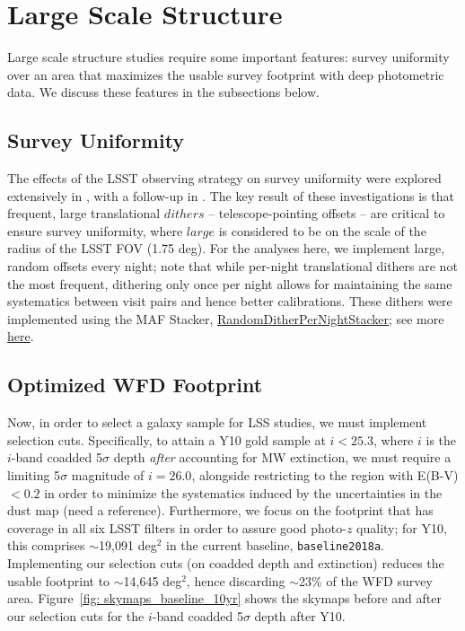 \newcommand{\ttt}[1]{\texttt{#1}}

\section{Large Scale Structure}
Large scale structure studies require some important features: survey uniformity over an area that maximizes the usable survey footprint with deep photometric data.  We discuss these features in the subsections below.
\subsection{Survey Uniformity}
The effects of the LSST observing strategy on survey uniformity were explored extensively in \citet{Awan+2016}, with a follow-up in \citet[Section 9.2]{Marshall:2017wph}. The key result of these investigations is that frequent, large translational $dithers$ -- telescope-pointing offsets -- are critical to ensure survey uniformity, where $large$ is considered to be on the scale of the radius of the LSST FOV (1.75 deg). For the analyses here, we implement large, random offsets every night; note that while per-night translational dithers are not the most frequent, dithering only once per night allows for maintaining the same systematics between visit pairs and hence better calibrations. These dithers were implemented using the MAF Stacker, \href{https://github.com/lsst/sims_maf/blob/97988f6bc30c216fffb41e6da0a7d201e919b9ca/python/lsst/sims/maf/stackers/ditherStackers.py#L371}{RandomDitherPerNightStacker}; see more \href{https://github.com/LSSTDESC/ObsStrat/tree/issue/3/desc-dithers}{here}.

\subsection{Optimized WFD Footprint}
Now, in order to select a galaxy sample for LSS studies, we must implement selection cuts. Specifically, to attain a Y10 gold sample at $i<25.3$, where $i$ is the $i$-band coadded 5$\sigma$ depth {\em after} accounting for MW extinction, we must require a limiting 5$\sigma$ magnitude of $i=26.0$, alongside restricting to the region with E(B-V) $<0.2$ in order to minimize the systematics induced by the uncertainties in the dust map (need a reference). Furthermore, we focus on the footprint that has coverage in all six LSST filters in order to assure good photo-$z$ quality; for Y10, this comprises $\sim$19,091 deg$^2$ in the current baseline, \ttt{baseline2018a}. Implementing our selection cuts (on coadded depth and extinction) reduces the usable footprint to $\sim$14,645 deg$^2$, hence discarding  $\sim$23\% of the WFD survey area. Figure~\ref{fig: skymaps_baseline_10yr} shows the skymaps before and after our selection cuts for the $i$-band coadded 5$\sigma$ depth after Y10.

